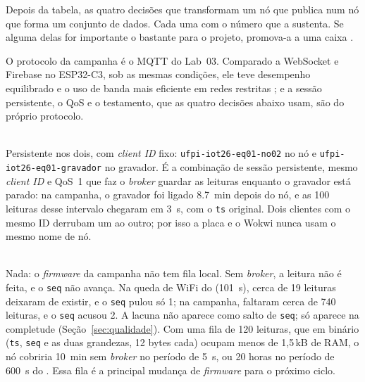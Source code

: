 \begin{orientacao}
Depois da tabela, as quatro decisões que transformam um nó que publica
num nó que forma um conjunto de dados. Cada uma com o número que a
sustenta. Se alguma delas for importante o bastante para o projeto,
promova-a a uma caixa .
\end{orientacao}

\noindent O protocolo da campanha é o MQTT do Lab~03. Comparado a
WebSocket e Firebase no ESP32-C3, sob as mesmas condições, ele teve
desempenho equilibrado e o uso de banda mais eficiente em redes
restritas \cite{yamin2026mqttwsfirebase}; e a sessão persistente, o
QoS e o testamento, que as quatro decisões abaixo usam, são do próprio
protocolo.

\begin{description}[style=unboxed, leftmargin=0pt, font=\normalfont\bfseries]
  \item[1. Sessão persistente ou limpa, no nó e no gravador.]\hfill\\
    Persistente nos dois, com \emph{client ID} fixo:
    \texttt{ufpi-iot26-eq01-no02} no nó e \texttt{ufpi-iot26-eq01-gravador}
    no gravador. É a combinação de sessão persistente, mesmo \emph{client
    ID} e QoS~1 que faz o \emph{broker} guardar as leituras enquanto o
    gravador está parado: na campanha, o gravador foi ligado
    \SI{8,7}{\minute} depois do nó, e as 100 leituras desse intervalo
    chegaram em \SI{3}{\second}, com o \texttt{ts} original. Dois clientes
    com o mesmo ID derrubam um ao outro; por isso a placa e o Wokwi nunca
    usam o mesmo nome de nó.
  \item[2. O que o nó faz com as leituras quando o broker está fora de alcance.]\hfill\\
    Nada: o \emph{firmware} da campanha não tem fila local. Sem
    \emph{broker}, a leitura não é feita, e o \texttt{seq} não avança. Na
    queda de WiFi do  (\SI{101}{\second}), cerca de 19 leituras
    deixaram de existir, e o \texttt{seq} pulou só 1; na campanha,
    faltaram cerca de 740 leituras, e o \texttt{seq} acusou 2. A lacuna
    não aparece como salto de \texttt{seq}; só aparece na completude
    (Seção~\ref{sec:qualidade}). Com uma fila de 120 leituras, que em
    binário (\texttt{ts}, \texttt{seq} e as duas grandezas, 12 bytes cada)
    ocupam menos de 1,5\,kB de RAM, o nó cobriria
    \SI{10}{\minute} sem \emph{broker} no período de \SI{5}{\second}, ou 20
    horas no período de \SI{600}{\second} do . Essa fila é a
    principal mudança de \emph{firmware} para o próximo ciclo.

\end{description}
